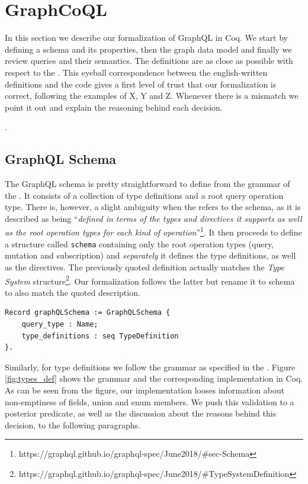 
\section{GraphCoQL}\label{sec:form}

In this section we describe our formalization of GraphQL in Coq. We start by defining a schema and its properties, then the graph data model and finally we review queries and their semantics. The definitions are as close as possible with respect to the \spec{}. This eyeball correspondence between the english-written definitions and the code gives a first level of trust that our formalization is correct, following the examples of X, Y and Z. Whenever there is a mismatch we point it out and explain the reasoning behind each decision.


.

\subsection{GraphQL Schema}\label{subsec:schema}

The GraphQL schema is pretty straightforward to define from the grammar of the \spec{}. It consists of a collection of type definitions and a root query operation type. There is, however, a slight ambiguity when the \spec{} refers to the schema, as it is described as being ``\textit{defined in terms of the types and directives it supports as well as the root operation types for each kind of operation}''\footnote{https://graphql.github.io/graphql-spec/June2018/\#sec-Schema}. It then proceeds to define a structure called \texttt{schema} containing only the root operation types (query, mutation and subscription) and \textit{separately} it defines the type definitions, as well as the directives. The previously quoted definition actually matches the \textit{Type System} structure\footnote{https://graphql.github.io/graphql-spec/June2018/\#TypeSystemDefinition}. Our formalization follows the latter but rename it to schema to also match the quoted description.

\begin{verbatim}
Record graphQLSchema := GraphQLSchema {
    query_type : Name;
    type_definitions : seq TypeDefinition
}.
\end{verbatim}

Similarly, for type definitions we follow the grammar as specified in the \spec{}. Figure \ref{fig:types_def} shows the grammar and the corresponding implementation in Coq. As can be seen from the figure, our implementation looses information about non-emptiness of fields, union and enum members. We push this validation to a posterior predicate, as well as the discussion about the reasons behind this decision, to the following paragraphs.

